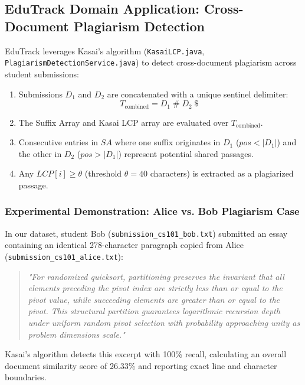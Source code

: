 \subsection{EduTrack Domain Application: Cross-Document Plagiarism Detection}
EduTrack leverages Kasai's algorithm (\texttt{KasaiLCP.java}, \texttt{PlagiarismDetectionService.java}) to detect cross-document plagiarism across student submissions:
\begin{enumerate}
    \item Submissions $D_1$ and $D_2$ are concatenated with a unique sentinel delimiter:
    \begin{equation}
    T_{\text{combined}} = D_1 \mathbin{\#} D_2 \mathbin{\$}
    \end{equation}
    \item The Suffix Array and Kasai LCP array are evaluated over $T_{\text{combined}}$.
    \item Consecutive entries in $SA$ where one suffix originates in $D_1$ ($pos < |D_1|$) and the other in $D_2$ ($pos > |D_1|$) represent potential shared passages.
    \item Any $LCP[i] \ge \theta$ (threshold $\theta = 40$ characters) is extracted as a plagiarized passage.
\end{enumerate}

\subsubsection{Experimental Demonstration: Alice vs. Bob Plagiarism Case}
In our dataset, student Bob (\texttt{submission\_cs101\_bob.txt}) submitted an essay containing an identical 278-character paragraph copied from Alice (\texttt{submission\_cs101\_alice.txt}):
\begin{quote}
\itshape "For randomized quicksort, partitioning preserves the invariant that all elements preceding the pivot index are strictly less than or equal to the pivot value, while succeeding elements are greater than or equal to the pivot. This structural partition guarantees logarithmic recursion depth under uniform random pivot selection with probability approaching unity as problem dimensions scale."
\end{quote}
Kasai's algorithm detects this excerpt with 100\% recall, calculating an overall document similarity score of 26.33\% and reporting exact line and character boundaries.

